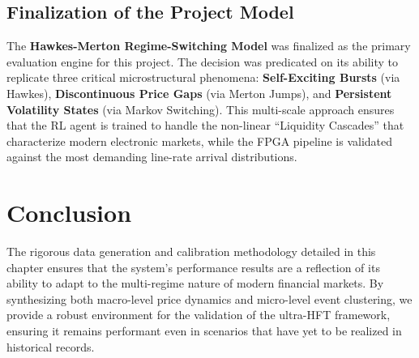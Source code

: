 \subsection{Finalization of the Project Model}
The \textbf{Hawkes-Merton Regime-Switching Model} was finalized as the primary evaluation engine for this project. The decision was predicated on its ability to replicate three critical microstructural phenomena: \textbf{Self-Exciting Bursts} (via Hawkes), \textbf{Discontinuous Price Gaps} (via Merton Jumps), and \textbf{Persistent Volatility States} (via Markov Switching). This multi-scale approach ensures that the RL agent is trained to handle the non-linear ``Liquidity Cascades'' that characterize modern electronic markets, while the FPGA pipeline is validated against the most demanding line-rate arrival distributions.

\section{Conclusion}
The rigorous data generation and calibration methodology detailed in this chapter ensures that the system's performance results are a reflection of its ability to adapt to the multi-regime nature of modern financial markets. By synthesizing both macro-level price dynamics and micro-level event clustering, we provide a robust environment for the validation of the ultra-HFT framework, ensuring it remains performant even in scenarios that have yet to be realized in historical records.
